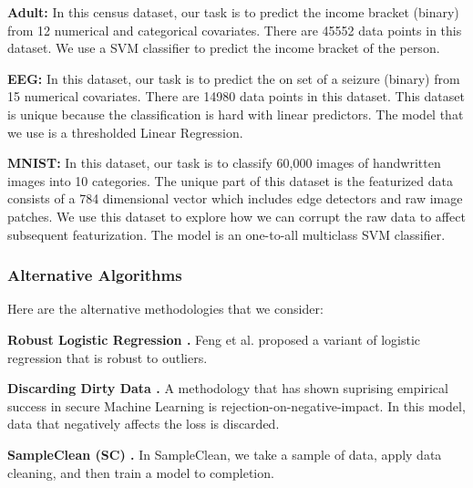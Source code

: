 \vspace{0.5em}

\noindent\textbf{Adult: } In this census dataset, our task is to predict the income bracket (binary) from 12 numerical and categorical covariates. There are 45552 data points in this dataset. We use a SVM classifier to predict the income bracket of the person.

\vspace{0.5em}

\noindent\textbf{EEG: } In this dataset, our task is to predict the on set of a seizure (binary) from 15 numerical covariates. There are 14980 data points in this dataset. This dataset is unique because the classification is hard with linear predictors. The model that we use is a thresholded Linear Regression.

\vspace{0.5em}

\noindent\textbf{MNIST: } In this dataset, our task is to classify 60,000 images of handwritten images into 10 categories. The unique part of this dataset is the featurized data consists of a 784 dimensional vector which includes edge detectors and raw image patches. We use this dataset to explore how we can corrupt the raw data to affect subsequent featurization. The model is an one-to-all multiclass SVM classifier. 

\subsubsection{Alternative Algorithms}
\noindent Here are the alternative methodologies that we consider:

\vspace{0.5em}

\noindent\textbf{Robust Logistic Regression \cite{feng2014robust}. } Feng et al. proposed a variant of logistic regression that is robust to outliers. 

\vspace{0.5em}

\noindent\textbf{Discarding Dirty Data \cite{li2014improved}. } A methodology that has shown suprising empirical success in secure Machine Learning is rejection-on-negative-impact. In this model, data that negatively affects the loss is discarded.

\vspace{0.5em}

\noindent\textbf{SampleClean (SC) \cite{wang1999sample}. } In SampleClean, we take a sample of data, apply data cleaning, and then train a model to completion.

